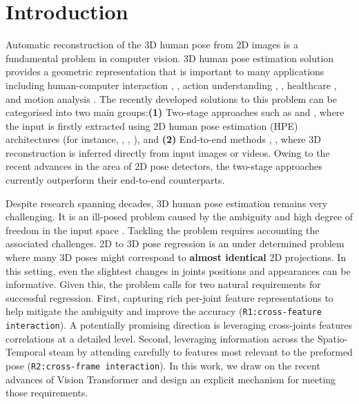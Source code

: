 \documentclass[runningheads]{llncs}
\begin{document}
\section{Introduction}
Automatic reconstruction of the 3D human pose from 2D images is a fundamental problem in computer vision. 3D human pose estimation solution provides a geometric representation that is important to many applications including human-computer interaction \cite{2021visual}, \cite{kisacanin2005real}, action understanding \cite{liu2019rgb}, \cite{hassanin2021learning}, healthcare \cite{ahad2019vision}, and motion analysis \cite{ahmedt2019vision}. The recently developed solutions to this problem can be categorised into two main groups:\textbf{(1)} Two-stage approaches such as \cite{zhao2019semantic} and \cite{cai2019exploiting}, where the input is firstly extracted using 2D human pose estimation (HPE) architectures (for instance, \cite{chen2018cascaded}, \cite{he2017mask}, \cite{radwan2019hierarchical}), and \textbf{(2)} End-to-end methods \cite{pavlakos2018ordinal}, \cite{moon2020i2l}, where 3D reconstruction is inferred directly from input images or videos. Owing to the recent advances in the area of 2D pose detectors, the two-stage approaches currently outperform their end-to-end counterparts.  

Despite research spanning decades, 3D human pose estimation remains very challenging. It is an ill-posed problem caused by the ambiguity and high degree of freedom in the input space \cite{radwan2013monocular}. Tackling the problem requires accounting the associated challenges. 2D to 3D pose regression is an under determined problem where many 3D poses might correspond to \textbf{almost identical} 2D projections. In this setting, even the slightest changes in joints positions and appearances can be informative. Given this, the problem calls for two natural requirements for successful regression. First, capturing rich per-joint feature representations to help mitigate the ambiguity and improve the accuracy (\texttt{R1:cross-feature interaction}). A potentially promising direction is leveraging cross-joints features correlations at a detailed level. Second, leveraging information across the Spatio-Temporal steam by attending carefully to features most relevant to the preformed pose (\texttt{R2:cross-frame interaction}). In this work, we draw on the recent advances of Vision Transformer and design an explicit mechanism for meeting those requirements.
\end{document}
